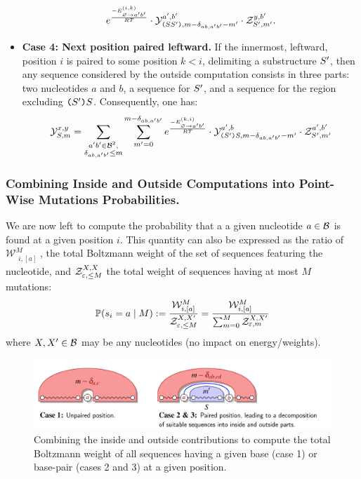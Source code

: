 \begin{itemize}
\begin{equation}
  		 e^{\frac{-E^{(i,k)}_{{\varnothing}\to{a'b'}}}{RT}}
		 \cdot\mathcal{Y}_{\text{\tt(}S S'\text{\tt )}, m- \delta_{ab,a'b'} - m'}^{a',b'}
     \cdot\mathcal{Z}_{S', m'}^{y,b'} .
\label{eq:Y_rec_C}
\end{equation}
\item {\bf Case 4: Next position paired leftward.} If the innermost, leftward, position $i$ is paired to some position $k<i$, delimiting a substructure $S'$, then any sequence considered by the outside computation consists in three parts: two nucleotides $a$ and $b$, a sequence for $S'$, and a sequence for the region excluding $\text{\tt(}S'\text{\tt )}S$. Consequently, one has:
\begin{equation}
	\mathcal{Y}_{S, m}^{x,y} = 
		 \sum_{\substack{a'b'\in \mathcal{B}^2,\\ \delta_{ab,a'b'}\le m}}
		 \sum_{m'=0}^{m-\delta_{ab,a'b'}}
   	 e^{\frac{-E^{(k,i)}_{{\varnothing}\to{a'b'}}}{RT}}
		 \cdot\mathcal{Y}_{\text{\tt(}S'\text{\tt )}S, m- \delta_{ab,a'b'} - m'}^{a',b}
     \cdot\mathcal{Z}_{S', m'}^{a',b'}
\label{eq:Y_rec_D}
\end{equation}
\end{itemize}

\subsubsection{Combining Inside and Outside Computations into Point-Wise Mutations Probabilities.}


We are now left to compute the probability that a a given nucleotide $a\in\mathcal{B}$ is found at a given position $i$.
This quantity can also be expressed as the ratio of $\mathcal{W}^M_{\substack{i, [a]}}$, the total Boltzmann weight 
of the set of sequences featuring the nucleotide, and $\mathcal{Z}_{\varepsilon, \le M}^{X,X}$ the total weight of sequences having at most $M$ mutations:
\begin{equation}
	\mathbb{P}(s_i = a\;|\; M) := \frac{\mathcal{W}^M_{\substack{i, [a]}}}{\mathcal{Z}_{\varepsilon, \le M}^{X,X'}} = \frac{\mathcal{W}^M_{\substack{i, [a]}}}{\sum_{m=0}^{M}\mathcal{Z}_{\varepsilon, m}^{X,X'}}\label{eq:normalize}
\end{equation}
where $X,X'\in\mathcal{B}$ may be any nucleotides (no impact on energy/weights).

\begin{figure}[t]\centering
\includegraphics[scale=\ScaleDP]{FigDPCombineWrapper}
\caption{Combining the inside and outside contributions to compute the total Boltzmann weight of all sequences having a given base (case 1) or base-pair (cases 2 and 3) at a given position.\label{fig:combine}}
\end{figure}

